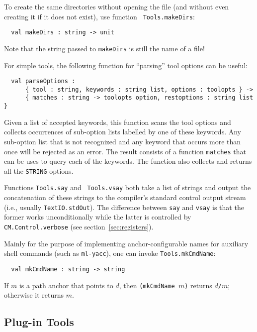 To create the same directories without opening the file (and without
even creating it if it does not exist), use function {\tt
Tools.makeDirs}:

\begin{lstlisting}
  val makeDirs : string -> unit
\end{lstlisting}%

Note that the string passed to {\tt makeDirs} is still the name of a
file!

  For simple tools, the following
function for ``parsing'' tool options can be useful:

\begin{lstlisting}
  val parseOptions :
      { tool : string, keywords : string list, options : toolopts } ->
      { matches : string -> toolopts option, restoptions : string list }
\end{lstlisting}%

Given a list of accepted keywords, this function scans the tool
options and collects occurrences of sub-option lists labelled by one
of these keywords.  Any sub-option list that is not recognized and any
keyword that occurs more than once will be rejected as an error.  The
result consists of a function {\tt matches} that can be uses to query
each of the keywords.  The function also collects and returns all the
{\tt STRING} options.

 Functions {\tt Tools.say} and {\tt
Tools.vsay} both take a list of strings and output the concatenation
of these strings to the compiler's standard control output stream
(i.e., usually {\tt TextIO.stdOut}).  The difference between {\tt say}
and {\tt vsay} is that the former works unconditionally while the
latter is controlled by {\tt CM.Control.verbose} (see
section~\ref{sec:registers}).

 Mainly for the purpose of
implementing anchor-configurable names for auxiliary shell commands
(such as {\tt ml-yacc}), one can invoke {\tt Tools.mkCmdName}:

\begin{lstlisting}
  val mkCmdName : string -> string
\end{lstlisting}%

If $m$ is a path anchor that points to $d$, then {\tt (mkCmdName $m$)}
returns $d${\tt /}$m$; otherwise it returns $m$.

\subsection{Plug-in Tools}
\label{sec:plugintools}

